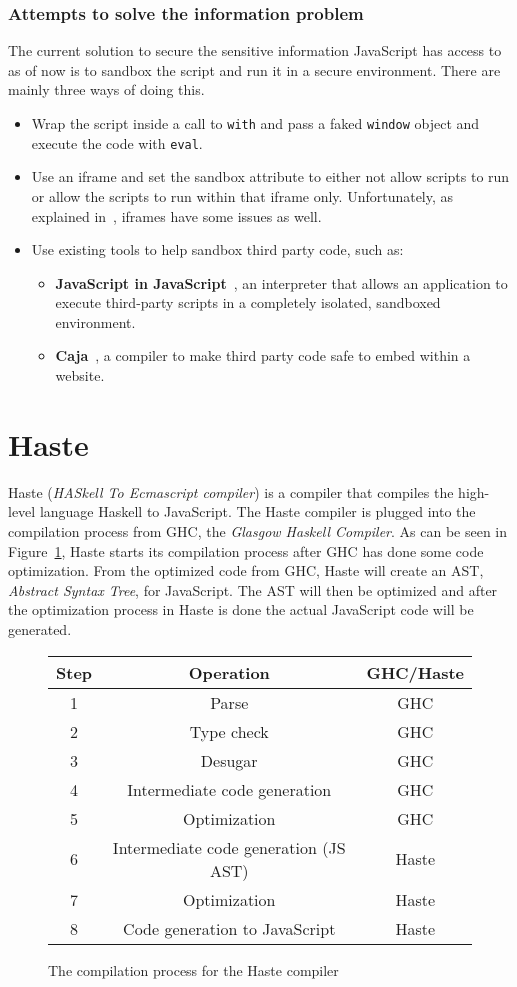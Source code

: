 \subsubsection{Attempts to solve the information problem}
The current solution to secure the sensitive information JavaScript has access to as of now is to sandbox the script and run it in a secure environment. There are mainly three ways of doing this.
\begin{itemize}
  \item Wrap the script inside a call to {\tt with} and pass a faked {\tt window} object and execute the code with {\tt eval}.
  \item Use an iframe and set the sandbox attribute to either not allow scripts to run or allow the scripts to run within that iframe only. Unfortunately, as explained in~\cite{js_in_js}, iframes have some issues as well.
  \item Use existing tools to help sandbox third party code, such as:
    \begin{itemize}
      \item \textbf{JavaScript in JavaScript}~\cite{js_in_js}, an interpreter that allows an application to execute third-party scripts in a completely isolated, sandboxed environment.
      \item \textbf{Caja}~\cite{caja_spec}, a compiler to make third party code safe to embed within a website.
    \end{itemize}
\end{itemize}
\section{Haste}
Haste (\emph{HASkell To Ecmascript compiler}) is a compiler that compiles the high-level language Haskell to JavaScript. The Haste compiler is plugged into the compilation process from GHC, the \emph{Glasgow Haskell Compiler}. As can be seen in Figure~\ref{fig:system}, Haste starts its compilation process after GHC has done some code optimization. From the optimized code from GHC, Haste will create an AST, \emph{Abstract Syntax Tree}, for JavaScript. The AST will then be optimized and after the optimization process in Haste is done the actual JavaScript code will be generated.
\begin{figure}[h]
  \begin{tabular}{|c|c|c|}
    \hline
    Step & Operation & GHC/Haste \\
    \hline
    1 & Parse & GHC \\
    2 & Type check & GHC \\
    3 & Desugar & GHC \\
    4 & Intermediate code generation & GHC \\
    5 & Optimization & GHC \\
    6 & Intermediate code generation (JS AST) & Haste \\
    7 & Optimization & Haste \\
    8 & Code generation to JavaScript & Haste \\
    \hline
  \end{tabular}
  \caption{The compilation process for the Haste compiler}
  \label{fig:system}
\end{figure}

